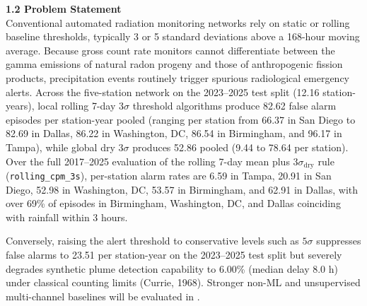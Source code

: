 \documentclass[11pt,a4paper]{article}
\begin{document}
\begin{framed}
\vspace{0.6em}
\noindent\textbf{1.2 Problem Statement}\\[0.3em]
Conventional automated radiation monitoring networks rely on static or rolling baseline thresholds, typically 3 or 5 standard deviations above a 168-hour moving average. Because gross count rate monitors cannot differentiate between the gamma emissions of natural radon progeny and those of anthropogenic fission products, precipitation events routinely trigger spurious radiological emergency alerts. Across the five-station network on the 2023--2025 test split (12.16 station-years), local rolling 7-day $3\sigma$ threshold algorithms produce 82.62 false alarm episodes per station-year pooled (ranging per station from 66.37 in San Diego to 82.69 in Dallas, 86.22 in Washington, DC, 86.54 in Birmingham, and 96.17 in Tampa), while global dry $3\sigma$ produces 52.86 pooled (9.44 to 78.64 per station). Over the full 2017--2025 evaluation of the rolling 7-day mean plus $3\sigma_{\text{dry}}$ rule (\texttt{rolling\_cpm\_3s}), per-station alarm rates are 6.59 in Tampa, 20.91 in San Diego, 52.98 in Washington, DC, 53.57 in Birmingham, and 62.91 in Dallas, with over 69\% of episodes in Birmingham, Washington, DC, and Dallas coinciding with rainfall within 3 hours.

Conversely, raising the alert threshold to conservative levels such as $5\sigma$ suppresses false alarms to 23.51 per station-year on the 2023--2025 test split but severely degrades synthetic plume detection capability to 6.00\% (median delay 8.0 h) under classical counting limits (Currie, 1968). Stronger non-ML and unsupervised multi-channel baselines will be evaluated in .


\end{framed}
\end{document}

